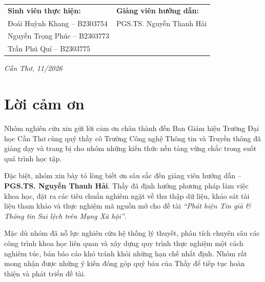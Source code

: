 \documentclass[11pt,a4paper]{extreport}
\begin{document}
\begin{titlepage}
    \vfill
    
    \begin{flushleft}
        \fontsize{12pt}{16pt}\selectfont
        \hspace{0.5cm}
        \begin{tabular}{p{7.6cm}p{6.2cm}}
            \textbf{Sinh viên thực hiện:} & \textbf{Giảng viên hướng dẫn:} \\
            Đoái Huỳnh Khang -- B2303754 & PGS.TS. Nguyễn Thanh Hải \\
            Nguyễn Trọng Phúc -- B2303773 & \\
            Trần Phú Quí -- B2303775 & \\
        \end{tabular}
    \end{flushleft}
    
    \vspace{1.2cm}
    {\fontsize{12pt}{14pt}\selectfont\textit{Cần Thơ, 11/2026} \\}
    \vspace{0.3cm}
\end{titlepage}

\newpage
{}

\chapter*{Lời cảm ơn}

Nhóm nghiên cứu xin gửi lời cảm ơn chân thành đến Ban Giám hiệu Trường Đại học Cần Thơ cùng quý thầy cô Trường Công nghệ Thông tin và Truyền thông đã giảng dạy và trang bị cho nhóm những kiến thức nền tảng vững chắc trong suốt quá trình học tập.

Đặc biệt, nhóm xin bày tỏ lòng biết ơn sâu sắc đến giảng viên hướng dẫn -- \textbf{PGS.TS. Nguyễn Thanh Hải}. Thầy đã định hướng phương pháp làm việc khoa học, đặt ra các tiêu chuẩn nghiêm ngặt về thu thập dữ liệu, khảo sát tài liệu tham khảo và thực nghiệm mã nguồn mở cho đề tài \textit{``Phát hiện Tin giả \& Thông tin Sai lệch trên Mạng Xã hội''}.

Mặc dù nhóm đã nỗ lực nghiên cứu hệ thống lý thuyết, phân tích chuyên sâu các công trình khoa học liên quan và xây dựng quy trình thực nghiệm một cách nghiêm túc, bản báo cáo khó tránh khỏi những hạn chế nhất định. Nhóm rất mong nhận được những ý kiến đóng góp quý báu của Thầy để tiếp tục hoàn thiện và phát triển đề tài.
\end{document}
